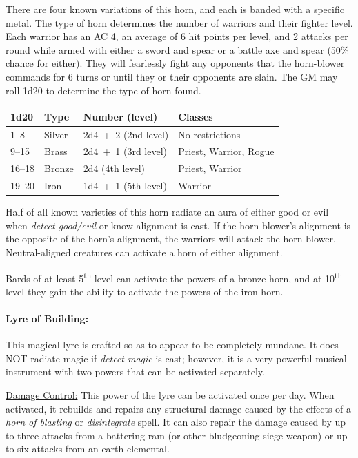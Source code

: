 \begin{multicols}{2}
There are four known variations of this horn, and each is banded with a specific metal.  The type of horn determines the number of warriors and their fighter level.  Each warrior has an AC 4, an average of 6 hit points per level, and 2 attacks per round while armed with either a sword and spear or a battle axe and spear (50\% chance for either).  They will fearlessly fight any opponents that the horn-blower commands for 6 turns or until they or their opponents are slain.  The GM may roll 1d20 to determine the type of horn found.

\noindent \begin{tabular}{|p{}|p{}|p{}|p{}|}
\hline
1d20	& Type	& Number (level)	& Classes \\
\hline\hline
\rowcolor[gray]{0.9}1--8	& Silver	& 2d4~+~2 (2nd level)	& No restrictions \\
9--15	& Brass	& 2d4~+~1 (3rd level)	& Priest, Warrior, Rogue \\
\rowcolor[gray]{0.9}16--18	& Bronze	& 2d4 (4th level)	& Priest, Warrior \\
19--20	& Iron	& 1d4~+~1 (5th level)	& Warrior \\
\hline
\end{tabular}

Half of all known varieties of this horn radiate an aura of either good or evil when \textit{detect good/evil} or know alignment is cast.  If the horn-blower's alignment is the opposite of the horn's alignment, the warriors will attack the horn-blower.  Neutral-aligned creatures can activate a horn of either alignment.  
 
Bards of at least 5\textsuperscript{th} level can activate the powers of a bronze horn, and at 10\textsuperscript{th} level they gain the ability to activate the powers of the iron horn.

\paragraph{Lyre of Building:} This magical lyre is crafted so as to appear to be completely mundane.  It does NOT radiate magic if \textit{detect magic} is cast; however, it is a very powerful musical instrument with two powers that can be activated separately.  

\underline{Damage Control:} This power of the lyre can be activated once per day.  When activated, it rebuilds and repairs any structural damage caused by the effects of a \textit{horn of blasting} or \textit{disintegrate} spell.  It can also repair the damage caused by up to three attacks from a battering ram (or other bludgeoning siege weapon) or up to six attacks from an earth elemental.


\end{multicols}
